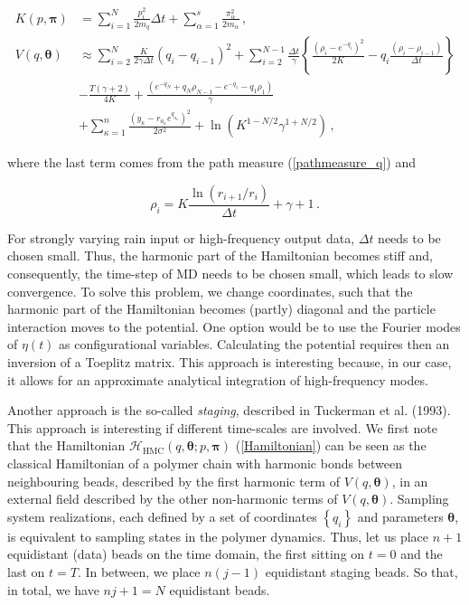 \documentclass[11pt, a4paper]{article}
\newcommand{\bt}{\pmb\theta}
\begin{document}
\begin{align}
   K( p,{\pmb\pi})
   &=
   \sum_{i=1}^N \frac{ p_i^2}{2m_q}\Delta t
   + \sum_{\alpha=1}^s\frac{\pi_\alpha^2}{2m_\alpha}\,,\label{Kdisc}
   \\
   V(q,\bt)
   &\approx
   \sum_{i=2}^{N}
  \frac{K}{2\gamma\Delta t}
  (q_i-q_{i-1})^2+\sum_{i=2}^{N-1} \frac{\Delta t}{\gamma} \left\{\frac{(\rho_i-e^{-q_i})^2}{2 K}  - q_i \frac{(\rho_i-\rho_{i-1})}{\Delta t} \right\}
  \\
  &- \frac{T (\gamma + 2)}{4 K}+\frac{\left(e^{-q_N}+q_N \rho_{N-1}- e^{-q_1}-q_1 \rho_{1} \right)}{\gamma} \nonumber
  \\
  & + \sum_{\kappa=1}^n \frac{(y_\kappa-r_{a_{\kappa}} e^{q_{a_{\kappa}}})^2}{2\sigma^2} +\ln \left(K^{1-N/2} \gamma^{1+N/2}\right)\nonumber
   \,,\label{Vdisc}
\end{align}

where the last term comes from the path measure (\ref{pathmeasure_q}) and

\begin{equation}\label{rhodisc}
\rho_i = K \frac{\ln(r_{i+1}/r_i)}{\Delta t}+\gamma+1\,.
\end{equation}


For strongly varying rain input or high-frequency output data, $\Delta t$ needs to be chosen small. Thus, the harmonic part of the Hamiltonian becomes stiff and, consequently, the time-step of MD needs to be chosen small, which leads to slow convergence.
To solve this problem, we change coordinates, such that the harmonic part of the Hamiltonian becomes (partly) diagonal and the particle interaction moves to the potential.
One option would be to use the Fourier modes of ${\eta}(t)$ as configurational variables. Calculating the potential requires then an inversion of a Toeplitz matrix. This approach is interesting because, in our case, it allows for an approximate analytical integration of high-frequency modes.

Another approach is the so-called \emph{staging}, described in Tuckerman et al. (1993). This approach is interesting if different time-scales are involved.
We first note that the Hamiltonian $\mathcal{H}_{\text{HMC}}(q,\bt; p,{\pmb\pi})$ (\ref{Hamiltonian}) can be seen as the classical Hamiltonian of a polymer chain with harmonic bonds between neighbouring beads, described by the first harmonic term of $V(q,\bt)$, in an external field described by the other non-harmonic terms of $V(q,\bt)$. Sampling system realizations, each defined by a set of coordinates $\left\{ q_i\right\}$ and parameters $\bt$, is equivalent to sampling states in the polymer dynamics. Thus, let us place $n+1$ equidistant (data) beads on the time domain, the first sitting on $t=0$ and the last on $t=T$. In between, we place $n(j-1)$ equidistant staging beads. So that, in total, we have $nj+1=N$ equidistant beads.
\end{document}

